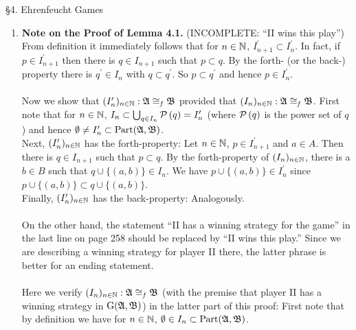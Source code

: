 \
\\
\\
{\large \S4. Ehrenfeucht Games}
\begin{enumerate}[1.]
\item \textbf{Note on the Proof of Lemma 4.1.} (INCOMPLETE: ``II wins this play'') From definition it immediately follows that for $n \in \mathbb{N}$, $I^\prime_{n + 1} \subset I^\prime_n$. In fact, if $p \in I^\prime_{n + 1}$ then there is $q \in I_{n + 1}$ such that $p \subset q$. By the forth- (or the back-) property there is $q^\prime \in I_n$ with $q \subset q^\prime$. So $p \subset q^\prime$ and hence $p \in I_n^\prime$.\\
\ \\
Now we show that $(I_n^\prime)_{n \in \mathbb{N}}: \mathfrak{A} \cong_\mathit{f} \mathfrak{B}$ provided that $(I_n)_{n \in \mathbb{N}}: \mathfrak{A} \cong_\mathit{f} \mathfrak{B}$. First note that for $n \in \mathbb{N}$, $I_n \subset \bigcup_{q \in I_n} {\mathcal{P}\left(q\right)} = I_n^\prime$ (where ${\mathcal{P}\left(q\right)}$ is the power set of $q$) and hence $\emptyset \neq I_n^\prime \subset {\mathrm{Part}(\mathfrak{A}, \mathfrak{B})}$.\medskip\\
Next, $(I_n^\prime)_{n \in \mathbb{N}}$ has the forth-property: Let $n \in \mathbb{N}$, $p \in I^\prime_{n + 1}$ and $a \in A$. Then there is $q \in I_{n + 1}$ such that $p \subset q$. By the forth-property of $(I_n)_{n \in \mathbb{N}}$, there is a $b \in B$ such that $q \cup \{(a, b)\} \in I_n$. We have $p \cup \{(a, b)\} \in I_n^\prime$ since $p \cup \{(a, b)\} \subset q \cup \{(a, b)\}$.\medskip\\
Finally, $(I_n^\prime)_{n \in \mathbb{N}}$ has the back-property: Analogously.\\
\ \\
On the other hand, the statement ``II has a winning strategy for the game'' in the last line on page 258 should be replaced by ``II wins this play.'' Since we are describing a winning strategy for player II there, the latter phrase is better for an ending statement.\\
\ \\
Here we verify $(I_n)_{n \in \mathbb{N}}: \mathfrak{A} \cong_\mathit{f} \mathfrak{B}$ (with the premise that player II has a winning strategy in ${\mathrm{G}(\mathfrak{A}, \mathfrak{B})}$) in the latter part of this proof: First note that by definition we have for $n \in \mathbb{N}$, $\emptyset \in I_n \subset {\mathrm{Part}(\mathfrak{A}, \mathfrak{B})}$.\medskip\\

\end{enumerate}
